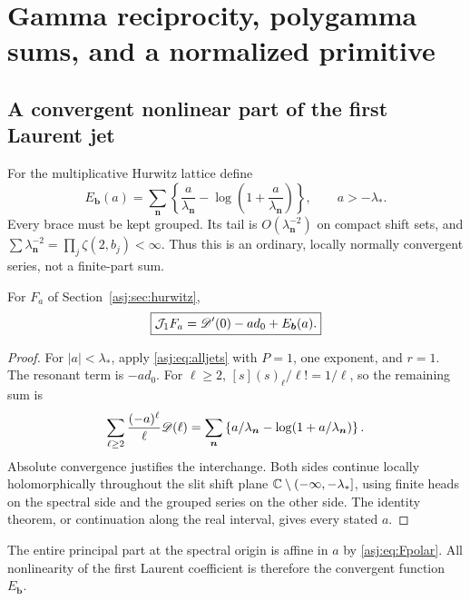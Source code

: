 \section{Gamma reciprocity, polygamma sums, and a normalized primitive}
\label{asj:sec:gamma}

\subsection{A convergent nonlinear part of the first Laurent jet}
For the multiplicative Hurwitz lattice define
\begin{equation}\label{asj:eq:Edef}
 E_{\boldsymbol b}(a)=\sum_{\boldsymbol n}
        \left\{\frac a{\lambda_{\boldsymbol n}}
                    -\log\left(1+\frac a{\lambda_{\boldsymbol n}}\right)\right\},
 \qquad a> -\lambda_*.
\end{equation}
Every brace must be kept grouped. Its tail is $O(\lambda_{\boldsymbol n}^{-2})$
on compact shift sets, and $\sum\lambda_{\boldsymbol n}^{-2}
=\prod_j\zeta(2,b_j)<\infty$. Thus this is an ordinary, locally normally
convergent series, not a finite-part sum.

\begin{proposition}\label{asj:thm:firstjet}
For $F_a$ of Section~\ref{asj:sec:hurwitz},
\begin{equation}\label{asj:eq:firstjet}
 \boxed{\displaystyle \mathcal J_1F_a=\mathscr D'(0)-a d_0+E_{\boldsymbol b}(a).}
\end{equation}
\end{proposition}
\begin{proof}
For $|a|<\lambda_*$, apply \eqref{asj:eq:alljets} with $P=1$, one exponent,
and $r=1$. The resonant term is $-a d_0$. For $\ell\ge2$,
$[s](s)_\ell/\ell!=1/\ell$, so the remaining sum is
\[
 \sum_{\ell\ge2}\frac{(-a)^\ell}{\ell}\mathscr D(\ell)
       =\sum_{\boldsymbol n}\left\{a/\lambda_{\boldsymbol n}
                  -\log(1+a/\lambda_{\boldsymbol n})\right\}.
\]
Absolute convergence justifies the interchange. Both sides continue
locally holomorphically throughout the slit shift plane
$\mathbb C\setminus(-\infty,-\lambda_*]$, using finite heads on the spectral
side and the grouped series on the other side. The identity theorem,
or continuation along the real interval, gives every stated $a$.
\end{proof}

The entire principal part at the spectral origin is affine in $a$ by
\eqref{asj:eq:Fpolar}. All nonlinearity of the first Laurent coefficient is
therefore the convergent function $E_{\boldsymbol b}$.

